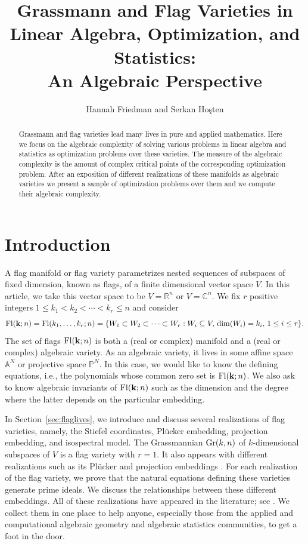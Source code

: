 \documentclass[12pt]{extarticle}
\title{\bf Grassmann and Flag Varieties in Linear Algebra, Optimization, and Statistics:\\ An Algebraic Perspective}
\author{Hannah Friedman and Serkan Ho\c{s}ten}
\date{}
\theoremstyle{definition}
\numberwithin{theorem}{section}
\newcommand{\PP}{\mathbb{P}}
\newcommand{\RR}{\mathbb{R}}
\newcommand{\CC}{\mathbb{C}}
\begin{document}
\maketitle

\begin{abstract}
  \noindent
 Grassmann and flag varieties lead many lives in pure and applied mathematics. Here we focus on the algebraic complexity of solving various problems in linear algebra and statistics as optimization problems over these varieties. The measure of the algebraic complexity is the amount of complex critical points of the corresponding optimization problem.   
 After an exposition of different realizations of these manifolds as algebraic varieties we present a sample of optimization problems over them and we compute their algebraic complexity. 
\end{abstract}

\section{Introduction}
A flag manifold or flag variety parametrizes nested sequences of subspaces  of fixed dimension, known as flags, of a finite dimensional vector space $V$. In this article, we take this vector space to be $V= \RR^n$ or $V=\CC^n$. We fix $r$ positive integers $1 \leq k_1 < k_2 < \cdots < k_r \leq n$ and consider 
$${\rm Fl}({\bf k};n) ={\rm Fl}(k_1, \ldots, k_r;n) = \{W_1 \subset W_2 \subset \cdots \subset W_r : W_i \subseteq V, \, \dim(W_i)= k_i, \, 1\leq i\leq r\}.$$
The set of flags ${\rm Fl}({\bf k};n)$ is both a (real or complex) manifold and a (real or complex) algebraic variety. 
As an algebraic variety, it lives in some affine space $\mathbb{A}^N$ or projective space $\PP^N$. 
In this case, we would like to know the defining equations, i.e., the polynomials whose common zero set is ${\rm Fl}({\bf k};n)$.
We also ask to know algebraic invariants of ${\rm Fl}({\bf k};n)$ such as the dimension and the degree where the latter depends on the particular embedding.

In Section~\ref{sec:flaglives}, we introduce and discuss several realizations of flag varieties, namely, the Stiefel coordinates, Pl\"{u}cker embedding, projection embedding, and  isospectral model.
The Grassmannian ${\rm Gr}(k,n)$ of $k$-dimensional subspaces of $V$ is a flag variety with $r=1$. It also appears with different realizations such as its Pl\"ucker and projection embeddings \cite{DFRS, fulton}. 
For each realization of the flag variety, we prove that the natural equations defining these varieties generate prime ideals. 
We discuss the relationships between these different embeddings. 
All of these realizations have appeared in the literature; see \cite{DFRS, fulton, LY24b, YWL}.
We collect them in one place to help anyone, especially those from the applied and computational algebraic geometry and algebraic statistics communities, to get a foot in the door. 
\end{document}
